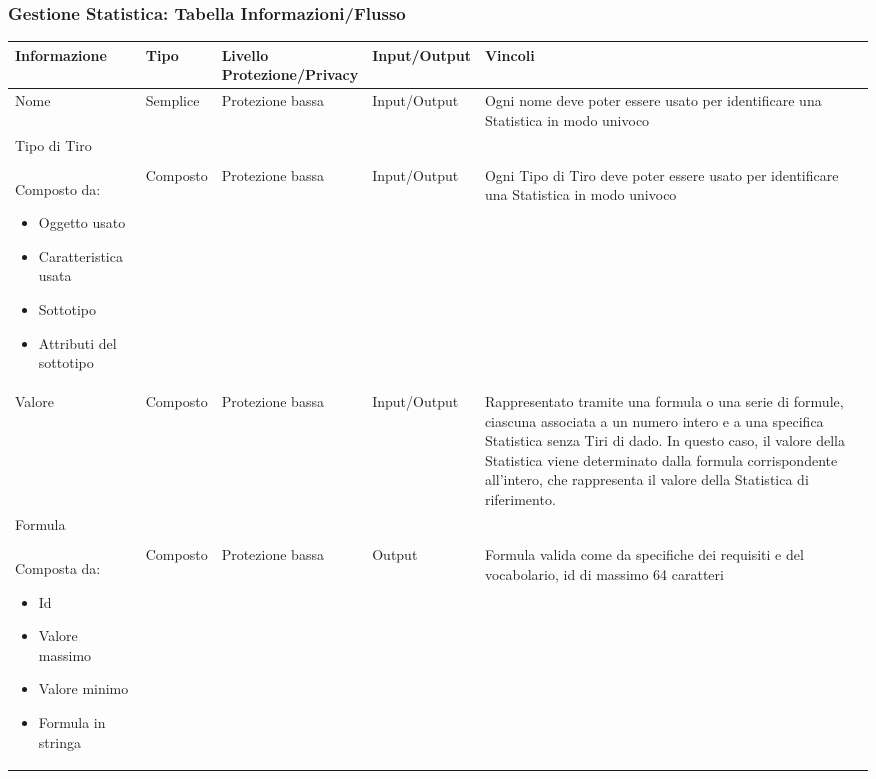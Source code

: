 \documentclass[a4paper, 11pt]{article}
\let\newline\\
\begin{document}
\subsubsection*{Gestione Statistica: Tabella Informazioni/Flusso}
\begin{center}
\setlength\LTleft{-0.5cm}
\setlength\LTright{-1cm}
    \begin{longtable}{|p{3cm}|p{1.5cm}|p{3.5cm}|p{2.5cm}|p{4cm}|}
        \hline
        \textbf{Informazione} & \textbf{Tipo} & \textbf{Livello \newline Protezione/Privacy} & \textbf{Input/Output}&\textbf{Vincoli}\\
        \hline
        Nome & Semplice & Protezione bassa & Input/Output & Ogni nome deve poter essere usato per identificare una Statistica in modo univoco \\\hline
        Tipo di Tiro \newline \newline Composto da: 
        \begin{itemize}
            \item Oggetto usato
            \item Caratteristica usata
            \item Sottotipo
            \item Attributi del sottotipo
        \end{itemize}& Composto & Protezione bassa & Input/Output & Ogni Tipo di Tiro deve poter essere usato per identificare una Statistica in modo univoco\\\hline
        Valore & Composto & Protezione bassa & Input/Output & Rappresentato tramite una formula o una serie di formule, ciascuna associata a un numero intero e a una specifica Statistica senza Tiri di dado. In questo caso, il valore della Statistica viene determinato dalla formula corrispondente all'intero, che rappresenta il valore della Statistica di riferimento. \\\hline
        Formula \newline \newline Composta da: 
        \begin{itemize}
            \item Id
            \item Valore massimo
            \item Valore minimo
            \item Formula in stringa
        \end{itemize}& Composto & Protezione bassa & Output & Formula valida come da specifiche dei requisiti e del vocabolario, id di massimo 64 caratteri \\\hline
    \end{longtable}
\end{center}
\end{document}
